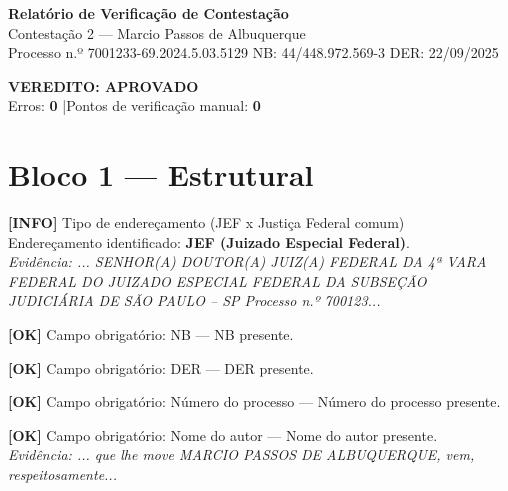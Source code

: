 \documentclass[12pt,a4paper]{article}
\newcommand{\statusOK}[1]{\textcolor{corOK}{\textbf{[OK]}} #1}
\newcommand{\statusINFO}[1]{\textcolor{corINFO}{\textbf{[INFO]}} #1}
\begin{document}
\begin{center}
  {\LARGE \textbf{Relatório de Verificação de Contestação}}\\[0.4em]
  {\large Contestação 2 --- Marcio Passos de Albuquerque}\\[0.2em]
  {\small Processo n.º 7001233-69.2024.5.03.5129 \quad NB: 44/448.972.569-3 \quad DER: 22/09/2025}
\end{center}

\vspace{0.5em}
\noindent\colorbox{corFundoAprovado}{%
  \begin{minipage}{\dimexpr\linewidth-2\fboxsep}
    \centering
    \vspace{0.3em}
    {\large \textcolor{corOK}{\textbf{VEREDITO: APROVADO}}}\\
    Erros: \textbf{0} \quad|\quad Pontos de verificação manual: \textbf{0}
    \vspace{0.3em}
  \end{minipage}%
}

\vspace{1em}

\section{Bloco 1 --- Estrutural}

\statusINFO{Tipo de endereçamento (JEF x Justiça Federal comum)}\\
Endereçamento identificado: \textbf{JEF (Juizado Especial Federal)}.\\
\textit{Evidência: ... SENHOR(A) DOUTOR(A) JUIZ(A) FEDERAL DA 4ª VARA FEDERAL DO JUIZADO ESPECIAL FEDERAL DA SUBSEÇÃO JUDICIÁRIA DE SÃO PAULO -- SP Processo n.º 700123...}

\medskip
\statusOK{Campo obrigatório: NB} --- NB presente.

\medskip
\statusOK{Campo obrigatório: DER} --- DER presente.

\medskip
\statusOK{Campo obrigatório: Número do processo} --- Número do processo presente.

\medskip
\statusOK{Campo obrigatório: Nome do autor} --- Nome do autor presente.\\
\textit{Evidência: ... que lhe move MARCIO PASSOS DE ALBUQUERQUE, vem, respeitosamente...}
\end{document}
